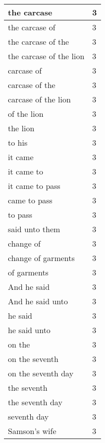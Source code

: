\begin{center}
\begin{longtable}{|p{3.0in}|p{0.5in}|}
the carcase & 3\\ \hline 
the carcase of & 3\\ \hline 
the carcase of the & 3\\ \hline 
the carcase of the lion & 3\\ \hline 
carcase of & 3\\ \hline 
carcase of the & 3\\ \hline 
carcase of the lion & 3\\ \hline 
of the lion & 3\\ \hline 
the lion & 3\\ \hline 
to his & 3\\ \hline 
it came & 3\\ \hline 
it came to & 3\\ \hline 
it came to pass & 3\\ \hline 
came to pass & 3\\ \hline 
to pass & 3\\ \hline 
said unto them & 3\\ \hline 
change of & 3\\ \hline 
change of garments & 3\\ \hline 
of garments & 3\\ \hline 
And he said & 3\\ \hline 
And he said unto & 3\\ \hline 
he said & 3\\ \hline 
he said unto & 3\\ \hline 
on the & 3\\ \hline 
on the seventh & 3\\ \hline 
on the seventh day & 3\\ \hline 
the seventh & 3\\ \hline 
the seventh day & 3\\ \hline 
seventh day & 3\\ \hline 
Samson's wife & 3\\ \hline 
\end{longtable}
\end{center}





